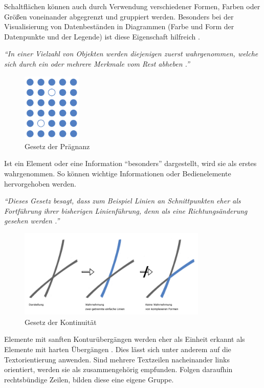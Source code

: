 Schaltflächen können auch durch Verwendung verschiedener Formen, Farben oder Größen voneinander abgegrenzt und gruppiert werden. Besonders bei der Visualisierung von Datenbeständen in Diagrammen (Farbe und Form der Datenpunkte und der Legende) ist diese Eigenschaft hilfreich \cite[S. 187]{Moser2012}.\par
{}
\textit{\enquote{In einer Vielzahl von Objekten werden diejenigen zuerst wahrgenommen, welche sich durch ein oder mehrere Merkmale vom Rest abheben \cite[S. 187]{Moser2012}.}}\par
\begin{figure}[H]
 \centering
 \includegraphics[width=0.25\textwidth]{grafiken/praegnanz.png}
 \caption{Gesetz der Prägnanz}
 \label{fig:gesetzPraeg}
\end{figure}
Ist ein Element oder eine Information \enquote{besonders} dargestellt, wird sie als erstes wahrgenommen. So können wichtige Informationen oder Bedienelemente hervorgehoben werden.\par
{}
\textit{\enquote{Dieses Gesetz besagt, dass zum Beispiel Linien an Schnittpunkten eher als Fortführung ihrer bisherigen Linienführung, denn als eine Richtungsänderung gesehen werden \cite{Grigo}.}}\par
\begin{figure}[H]
 \centering
 \includegraphics[width=0.8\textwidth]{grafiken/kontinuitaet.png}
 \caption{Gesetz der Kontinuität \cite{Grigo}}
 \label{fig:gesetzKonti}
\end{figure}
Elemente mit sanften Konturübergängen werden eher als Einheit erkannt als Elemente mit harten Übergängen \cite{Moser2012}.  Dies lässt sich unter anderem auf die Textorientierung anwenden. Sind mehrere Textzeilen nacheinander links orientiert, werden sie als zusammengehörig empfunden. Folgen daraufhin rechtsbündige Zeilen, bilden diese eine eigene Gruppe.\par
